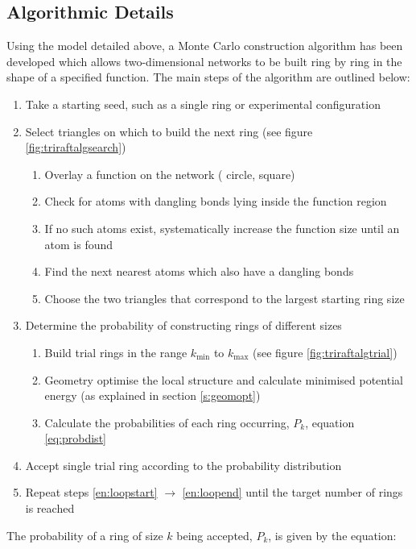 \subsection{Algorithmic Details}


Using the model detailed above, a Monte Carlo construction algorithm has been developed which allows two\--dimensional networks to be built ring by ring in the shape of a specified function. The main steps of the algorithm are outlined below:
\begin{enumerate}
	\item Take a starting seed, such as a single ring or experimental configuration
	\item Select triangles on which to build the next ring (see figure \ref{fig:triraftalgsearch})
		\label{en:loopstart}
		\begin{enumerate}
			\item Overlay a function on the network (\eg{} circle, square)
			\item Check for atoms with dangling bonds lying inside the function region
			\item If no such atoms exist, systematically increase the function size until an atom is found
			\item Find the next nearest atoms which also have a dangling bonds
			\item Choose the two triangles that correspond to the largest starting ring size	
		\end{enumerate}
	\item Determine the probability of constructing rings of different sizes
		\begin{enumerate}
			\item Build trial rings in the range $k_{\text{min}}$ to $k_{\text{max}}$ (see figure \ref{fig:triraftalgtrial})
			\item Geometry optimise the local structure and calculate minimised potential energy (as explained in section \ref{s:geomopt})
			\item Calculate the probabilities of each ring occurring, $P_k$, equation \eqref{eq:probdist}
		\end{enumerate}
	\item Accept single trial ring according to the probability distribution
		\label{en:loopend}
	\item Repeat steps \ref{en:loopstart} $\rightarrow$ \ref{en:loopend} until the target number of rings is reached
\end{enumerate}
The probability of a ring of size $k$ being accepted, $P_k$, is given by the equation:
